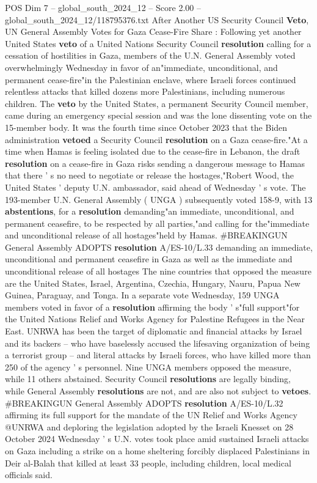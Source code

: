 \begin{textsample}{POS Dim 7 – global\_south\_2024\_12 – Score 2.00 – global\_south\_2024\_12/118795376.txt}  \label{ex:f7_pos_157}
After Another US Security Council \textbf{Veto}, UN General Assembly Votes for Gaza Cease-Fire Share : Following yet another United States \textbf{veto} of a United Nations Security Council \textbf{resolution} calling for a cessation of hostilities in Gaza, members of the U.N.
General Assembly voted overwhelmingly Wednesday in favor of an"immediate, unconditional, and permanent cease-fire"in the Palestinian enclave, where Israeli forces continued relentless attacks that killed dozens more Palestinians, including numerous children.
The \textbf{veto} by the United States, a permanent Security Council member, came during an emergency special session and was the lone dissenting vote on the 15-member body.
It was the fourth time since October 2023 that the Biden administration \textbf{vetoed} a Security Council \textbf{resolution} on a Gaza cease-fire."At a time when Hamas is feeling isolated due to the cease-fire in Lebanon, the draft \textbf{resolution} on a cease-fire in Gaza risks sending a dangerous message to Hamas that there ' s no need to negotiate or release the hostages,"Robert Wood, the United States ' deputy U.N. ambassador, said ahead of Wednesday ' s vote.
The 193-member U.N.
General Assembly ( UNGA ) subsequently voted 158-9, with 13 \textbf{abstentions}, for a \textbf{resolution} demanding"an immediate, unconditional, and permanent ceasefire, to be respected by all parties,"and calling for the"immediate and unconditional release of all hostages"held by Hamas. \#BREAKINGUN General Assembly ADOPTS \textbf{resolution} A/ES-10/L.33 demanding an immediate, unconditional and permanent ceasefire in Gaza as well as the immediate and unconditional release of all hostages The nine countries that opposed the measure are the United States, Israel, Argentina, Czechia, Hungary, Nauru, Papua New Guinea, Paraguay, and Tonga.
In a separate vote Wednesday, 159 UNGA members voted in favor of a \textbf{resolution} affirming the body ' s"full support"for the United Nations Relief and Works Agency for Palestine Refugees in the Near East.
UNRWA has been the target of diplomatic and financial attacks by Israel and its backers -- who have baselessly accused the lifesaving organization of being a terrorist group -- and literal attacks by Israeli forces, who have killed more than 250 of the agency ' s personnel.
Nine UNGA members opposed the measure, while 11 others abstained.
Security Council \textbf{resolutions} are legally binding, while General Assembly \textbf{resolutions} are not, and are also not subject to \textbf{vetoes}. \#BREAKINGUN General Assembly ADOPTS \textbf{resolution} A/ES-10/L.32 affirming its full support for the mandate of the UN Relief and Works Agency @UNRWA and deploring the legislation adopted by the Israeli Knesset on 28 October 2024 Wednesday ' s U.N. votes took place amid sustained Israeli attacks on Gaza including a strike on a home sheltering forcibly displaced Palestinians in Deir al-Balah that killed at least 33 people, including children, local medical officials said.

\end{textsample}
